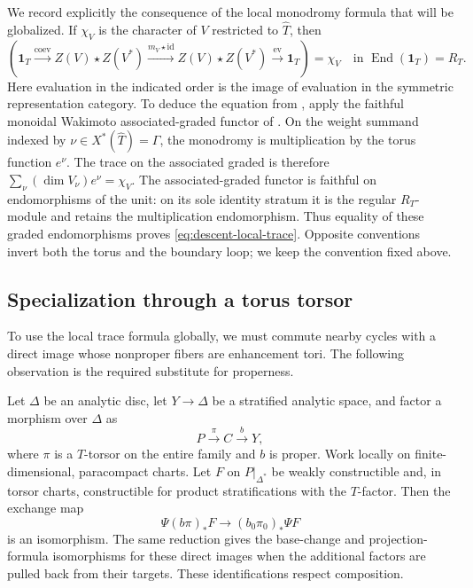 We record explicitly the consequence of the local monodromy formula
that will be globalized.  If $\chi_V$ is the character of $V$ restricted
to $\widehat T$, then
\begin{equation}\label{eq:descent-local-trace}
 \left(
 \mathbf 1_T\xrightarrow{\mathrm{coev}}
 Z(V)\star Z(V^*)
 \xrightarrow{m_V\star\mathrm{id}}
 Z(V)\star Z(V^*)
 \xrightarrow{\mathrm{ev}}\mathbf 1_T
 \right)=\chi_V\quad\text{in }\operatorname{End}(\mathbf 1_T)=R_T.
\end{equation}
Here evaluation in the indicated order is the image of evaluation in
the symmetric representation category.  To deduce the equation from
\cite[Proposition~9.3.1(a)--(c)]{DT}, apply the faithful monoidal
Wakimoto associated-graded functor of \cite[Proposition~5.3.1]{DT}.
On the weight summand indexed by
$\nu\in X^*(\widehat T)=\Gamma$, the monodromy is multiplication by
the torus function $e^\nu$.  The trace on the associated graded is
therefore $\sum_\nu(\dim V_\nu)e^\nu=\chi_V$.  The associated-graded
functor is faithful on endomorphisms of the unit: on its sole identity
stratum it is the regular $R_T$-module and retains the multiplication
endomorphism.  Thus equality of these graded endomorphisms proves
\eqref{eq:descent-local-trace}.  Opposite conventions invert both the
torus and the boundary loop; we keep the convention fixed above.

\subsection{Specialization through a torus torsor}

To use the local trace formula globally, we must commute nearby cycles
with a direct image whose nonproper fibers are enhancement tori.
The following observation is the required substitute for properness.

\begin{lemma}\label{lem:descent-radial}
Let $\Delta$ be an analytic disc, let $Y\to\Delta$ be a stratified
analytic space, and factor a morphism over $\Delta$ as
\[
 P\xrightarrow{\pi} C\xrightarrow{b}Y,
\]
where $\pi$ is a $T$-torsor on the entire family and $b$ is proper.
Work locally on finite-dimensional, paracompact charts.  Let $F$ on
$P|_{\Delta^*}$ be weakly constructible and, in torsor charts,
constructible for product stratifications with the $T$-factor.
Then the exchange map
\begin{equation}\label{eq:descent-push-exchange}
 \Psi(b\pi)_*F\longrightarrow(b_0\pi_0)_*\Psi F
\end{equation}
is an isomorphism.  The same reduction gives the base-change and
projection-formula isomorphisms for these direct images when the
additional factors are pulled back from their targets.  These
identifications respect composition.
\end{lemma}


